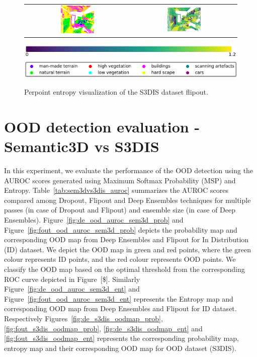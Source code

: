 \begin{figure}[h!]
\begin{tabular}{cc}
            \includegraphics[width=0.33\textwidth, height=0.18\textheight]{images/seg_output/s3dis_DE/office_42.pdf}& 
            \includegraphics[width=0.33\textwidth, height=0.18\textheight]{images/seg_output/flipout/ent_fout_s3dis_4.pdf}\\
        \end{tabular}
        \includegraphics[scale=0.45]{images/ent_legend.pdf}
        \includegraphics[scale=0.45]{images/legend.png}
        \caption{Perpoint entropy visualization of the S3DIS dataset flipout.}
        \label{fig:fout_s3dis_entmap}
    \end{figure}
    \FloatBarrier
    \section{OOD detection evaluation - Semantic3D vs S3DIS}
    In this experiment, we evaluate the performance of the OOD detection using the AUROC scores generated using Maximum Softmax Probability (MSP) and Entropy.
    Table~\ref{tab:sem3dvs3dis_auroc} summarizes the AUROC scores compared among Dropout, Flipout and Deep Ensembles techniques for multiple passes (in case of Dropout and Flipout) and ensemble size (in case of Deep Ensembles).
    Figure~\ref{fig:de_ood_auroc_sem3d_prob} and Figure~\ref{fig:fout_ood_auroc_sem3d_prob} depicts the probability map and corresponding OOD map from Deep Ensembles and Flipout for In Distribution (ID) dataset.
    We depict the OOD map in green and red points, where the green colour represents ID points, and the red colour represents OOD points.
    We classify the OOD map based on the optimal threshold from the corresponding ROC curve depicted in Figure~[\$].
    Similarly Figure~\ref{fig:de_ood_auroc_sem3d_ent} and Figure~\ref{fig:fout_ood_auroc_sem3d_ent} represents the Entropy map and corresponding OOD map from Deep Ensembles and Flipout for ID dataset.
    Respectively Figures~\ref{fig:de_s3dis_oodmap_prob}, \ref{fig:fout_s3dis_oodmap_prob}, \ref{fig:de_s3dis_oodmap_ent} and \ref{fig:fout_s3dis_oodmap_ent} represents the corresponding probability map, entropy map and their corresponding OOD map for OOD dataset (S3DIS).
    
